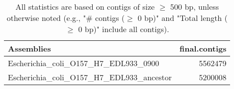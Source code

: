 \documentclass[12pt,a4paper]{article}
\begin{document}
\begin{table}[ht]
\begin{center}
\caption{All statistics are based on contigs of size $\geq$ 500 bp, unless otherwise noted (e.g., "\# contigs ($\geq$ 0 bp)" and "Total length ($\geq$ 0 bp)" include all contigs).}
\begin{tabular}{|l*{1}{|r}|}
\hline
Assemblies & final.contigs \\ \hline
Escherichia\_coli\_O157\_H7\_EDL933\_0900 & 5562479 \\ \hline
Escherichia\_coli\_O157\_H7\_EDL933\_ancestor & 5200008 \\ \hline
\end{tabular}
\end{center}
\end{table}
\end{document}
